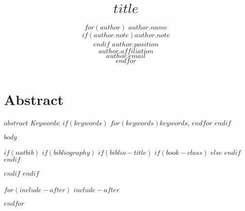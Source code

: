 \documentclass[numbered]{trbarticle}
\title{$title$}
\author{%
  $for(author)$
  \textbf{$author.name$}\\
  \textit{$if(author.note)$$author.note$\\$endif$}
  $author.position$\\
  $author.affiliation$\\
  $author.email$\\
  \hfill\break
  $endfor$
}
\begin{document}
\maketitle


\section{Abstract}
$abstract$
\hfill\break%
\hfill\break%
\noindent\textit{Keywords}: $if(keywords)$ $for(keywords)$$keywords$, $endfor$ $endif$
\newpage

$body$

\newpage
$if(natbib)$
$if(bibliography)$
$if(biblio-title)$
$if(book-class)$
\renewcommand\bibname{$biblio-title$}
$else$
\renewcommand\refname{$biblio-title$}
$endif$
$endif$


$endif$
$endif$

$for(include-after)$
$include-after$

$endfor$
\end{document}
